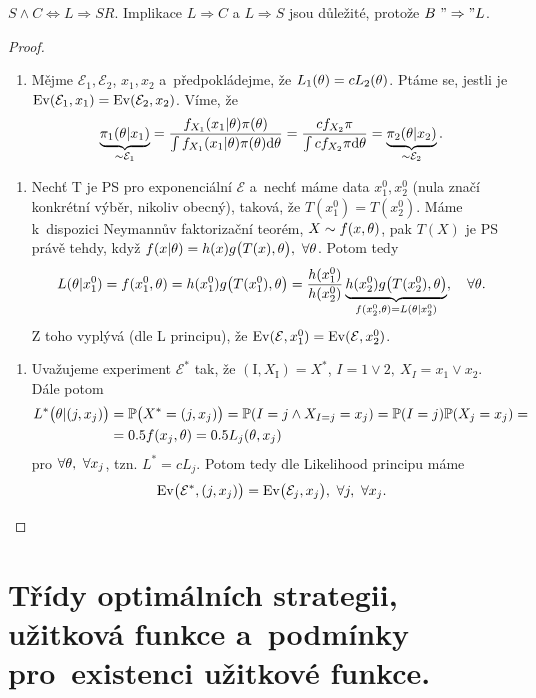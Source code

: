 \begin{theorem}
	$S\wedge C\Leftrightarrow L\Rightarrow SR$. Implikace $L\Rightarrow C$ a $L\Rightarrow S$ jsou důležité, protože $B~"\Rightarrow" L$.
	\begin{proof}
		\begin{enumerate}[$B"\Rightarrow"L$:]
			\item Mějme $\mathcal{E}_1,\mathcal{E}_2$, $x_1,x_2$ a~předpokládejme, že $L_1(\theta)=c L_2(\theta)$. Ptáme se, jestli je $\mathrm{Ev}(\mathcal{E}_1,x_1)=\mathrm{Ev}(\mathcal{E}_2,x_2)$. Víme, že $$ \underbrace{\pi_1(\theta|x_1)}_{\sim\mathcal{E}_1}=\frac{f_{X_1}(x_1|\theta)\pi(\theta)}{\int f_{X_1}(x_1|\theta)\pi(\theta)\mathrm{d}\theta}=\frac{c f_{X_2}\pi}{\int c f_{X_2}\pi\mathrm{d}\theta}=\underbrace{\pi_2(\theta| x_2)}_{\sim\mathcal{E}_2}.$$
		\end{enumerate}
	\begin{enumerate}[$L\Rightarrow S$:]
		\item Nechť T je PS pro exponenciální $\mathcal{E}$ a~nechť máme data $x_1^0,x_2^0$ (nula značí konkrétní výběr, nikoliv obecný), taková, že $T(x_1^0)=T(x_2^0)$. Máme k~dispozici Neymannův faktorizační teorém, $X\sim f(x,\theta)$, pak $T(X)$ je PS právě tehdy, když $f(x|\theta)=h(x)g\big(T(x),\theta \big),~\forall\theta$. Potom tedy 
		$$ L(\theta|x_1^0)=f(x_1^0,\theta)=h(x_1^0)g\big( T(x_1^0),\theta \big)=\frac{h(x_1^0)}{h(x_2^0)}\underbrace{h(x_2^0)g\big(T(x_2^0),\theta \big)}_{f(x_2^0,\theta)=L(\theta|x_2^0)},\quad\forall\theta.$$
		Z toho vyplývá (dle L principu), že $\mathrm{Ev}(\mathcal{E},x_1^0)=\mathrm{Ev}(\mathcal{E},x_2^0)$.
\end{enumerate}
\begin{enumerate}[$L\Rightarrow C$:]
	\item Uvažujeme experiment $\mathcal{E}^*$ tak, že $(\mathrm{I},X_\mathrm{I})=X^*$, $I=1\vee 2,~X_I=x_1\vee x_2$. 
	Dále potom \[
	\begin{split}
	L^*\big(\theta|(j,x_j)\big)&=\mathbb{P}\big(X^*=(j,x_j) \big)=\mathbb{P}(I=j\wedge X_{I=j}=x_j)=\mathbb{P}(I=j)\mathbb{P}(X_j=x_j)=\\&=0.5f(x_j,\theta)=0.5 L_j(\theta,x_j)
	\end{split}
	\]
	pro $\forall\theta,~\forall x_j$, tzn. $L^*=c L_j$. Potom tedy dle Likelihood principu máme $$\mathrm{Ev}\big(\mathcal{E}^*,(j,x_j) \big)=\mathrm{Ev}\big(\mathcal{E}_j,x_j \big),~\forall j,~\forall x_j.$$
\end{enumerate}
	\end{proof}
\end{theorem}

\chapter{Třídy optimálních strategii, užitková funkce a~podmínky pro~existenci užitkové funkce.}

